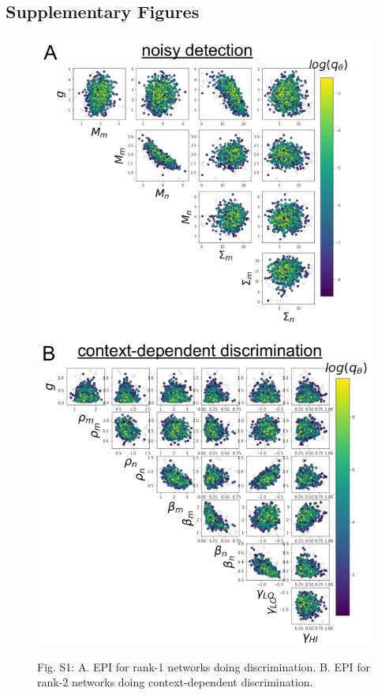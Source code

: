 \documentclass[11pt]{article}
\begin{document}


\subsection{Supplementary Figures}

\begin{figure}
\begin{center}
\includegraphics[scale=0.5]{figures/figS1/figS1.pdf}
\end{center}
Fig. S1: A. EPI for rank-1 networks doing discrimination. B. EPI for rank-2 networks doing context-dependent discrimination.
\end{figure}
\end{document}
